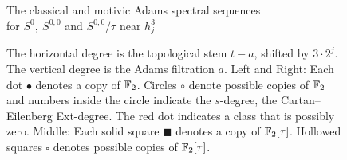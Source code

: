 

\begin{figure}[h]
  \centering
  The classical and motivic Adams spectral sequences \\
  for $S^0, \ S^{0,0}$ and $S^{0,0}/\tau$ near $h_j^3$
  \scalebox{1.00}{
    \printpage[ name = 3charts1hj3, page = 3, y axis gap = 0.8cm, right clip padding = 0cm, x axis extend end = 0.75cm ] \quad
    \printpage[ name = 3charts2hj3, page = 3, no y ticks, x axis tail = 0cm, y axis gap = 0.8cm, right clip padding = 0cm, x axis extend end = 0.75cm ] \quad
    \printpage[ name = 3charts3hj3, page = 3, no y ticks, x axis tail = 0cm, y axis gap = 0.8cm, right clip padding = 0cm, x axis extend end = 0.75cm ]
  }
  \caption{ 
    The horizontal degree is the topological stem $t-a$, shifted by $3\cdot 2^j$.     
    The vertical degree is the Adams filtration $a$. 
    Left and Right:
    Each dot $\bullet$ denotes a copy of $\operatorname{\mathbb{F}}_2$. 
    Circles $\circ$ denote possible copies of $\operatorname{\mathbb{F}}_2$ and
    numbers inside the circle indicate the $s$-degree, the Cartan--Eilenberg Ext-degree.
    The red dot indicates a class that is possibly zero.
    Middle: 
    Each solid square $\blacksquare$ denotes a copy of $\operatorname{\mathbb{F}}_2[\tau]$. 
    Hollowed squares $\square$ denotes possible copies of $\operatorname{\mathbb{F}}_2[\tau]$.}
  \label{fig:3charts}    
\end{figure}


